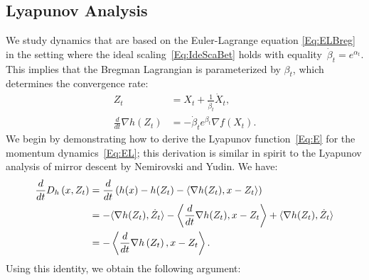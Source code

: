 \documentclass[11pt]{article}
\theoremstyle{plain}
\begin{document}
 \subsection{Lyapunov Analysis}
We study dynamics that are based on the Euler-Lagrange equation \eqref{Eq:ELBreg} in the setting where the ideal scaling~\eqref{Eq:IdeScaBet} holds with equality~$\dot \beta_t = e^{\alpha_t}$. This implies that the Bregman Lagrangian is parameterized by $\beta_t$, which determines the convergence rate:
 \begin{subequations}\label{Eq:EL}
 \begin{align}
 Z_t &= X_t + \frac{1}{\dot \beta_t} \dot X_t \label{Eq:ELZ},\\
 \frac{d}{dt}\nabla h(Z_t) &= -\dot \beta_t e^{\beta_t} \nabla f(X_t)\label{Eq:ELH}.
 \end{align}
 \end{subequations}
We begin by demonstrating how to derive the Lyapunov function~\eqref{Eq:E} for the momentum dynamics~\eqref{Eq:EL}; this derivation is similar in spirit to the Lyapunov analysis of mirror descent by Nemirovski and Yudin.  We have:
\begin{subequations}
\begin{align}
 \frac{d}{dt}D_h\left(x, Z_t\right)  &= \frac{d}{dt}\left( h(x) - h(Z_t) - \langle \nabla h(Z_t), x- Z_t\rangle\right)  \notag\\
& = - \langle \nabla h(Z_t), \dot Z_t\rangle -\left\langle \frac{d}{dt} \nabla h(Z_t),x - Z_t\right\rangle  + \langle \nabla h(Z_t), \dot Z_t\rangle \notag\\ 
 &= -\left\langle \frac{d}{dt} \nabla h\left(Z_t\right), x - Z_t\right\rangle. \, \notag%
 \end{align*}
 \end{subequations}
Using this identity, we obtain the following argument:
\end{document}

